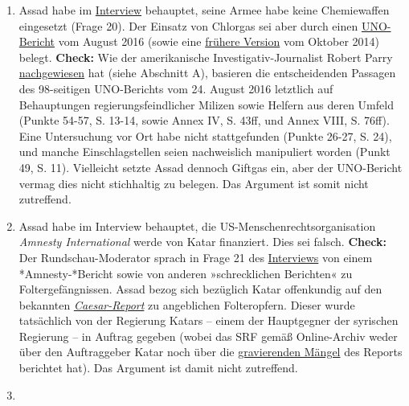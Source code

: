 \begin{enumerate}
\def\labelenumi{\arabic{enumi}.}
\tightlist
\item
  Assad habe im
  \href{https://www.srf.ch/content/download/11266054/127635839/version/2/file/Transkript+des+ganzen+Interviews.pdf}{Interview}
  behauptet, seine Armee habe keine Chemiewaffen eingesetzt (Frage 20).
  Der Einsatz von Chlorgas sei aber durch einen
  \href{http://daccess-ods.un.org/access.nsf/GetFile?OpenAgent\&DS=S/2016/738\&Lang=E\&Type=PDF}{UNO-Bericht}
  vom August 2016 (sowie eine
  \href{http://www.ohchr.org/Documents/HRBodies/HRCouncil/CoISyria/A.HRC.27.60_Eng.pdf}{frühere
  Version} vom Oktober 2014) belegt. \textbf{Check:} Wie der
  amerikanische Investigativ-Journalist Robert Parry
  \href{https://consortiumnews.com/2016/09/08/un-team-heard-claims-of-staged-chemical-attacks/}{nachgewiesen}
  hat (siehe Abschnitt A), basieren die entscheidenden Passagen des
  98-seitigen UNO-Berichts vom 24. August 2016 letztlich auf
  Behauptungen regierungsfeindlicher Milizen sowie Helfern aus deren
  Umfeld (Punkte 54-57, S. 13-14, sowie Annex IV, S. 43ff, und Annex
  VIII, S. 76ff). Eine Untersuchung vor Ort habe nicht stattgefunden
  (Punkte 26-27, S. 24), und manche Einschlagstellen seien nachweislich
  manipuliert worden (Punkt 49, S. 11). Vielleicht setzte Assad dennoch
  Giftgas ein, aber der UNO-Bericht vermag dies nicht stichhaltig zu
  belegen. Das Argument ist somit nicht zutreffend.
\item
  Assad habe im Interview behauptet, die US-Menschenrechtsorganisation
  \emph{Amnesty International} werde von Katar finanziert. Dies sei
  falsch. \textbf{Check:} Der Rundschau-Moderator sprach in Frage 21 des
  \href{https://www.srf.ch/content/download/11266054/127635839/version/2/file/Transkript+des+ganzen+Interviews.pdf}{Interviews}
  von einem *Amnesty-*Bericht sowie von anderen »schrecklichen
  Berichten« zu Foltergefängnissen. Assad bezog sich bezüglich Katar
  offenkundig auf den bekannten
  \emph{\href{https://en.wikipedia.org/wiki/2014_Syrian_detainee_report}{Caesar-Report}}
  zu angeblichen Folteropfern. Dieser wurde tatsächlich von der
  Regierung Katars -- einem der Hauptgegner der syrischen Regierung --
  in Auftrag gegeben (wobei das SRF gemäß Online-Archiv weder über den
  Auftraggeber Katar noch über die
  \href{http://www.counterpunch.org/2016/03/04/the-caesar-photo-fraud-that-undermined-syrian-negotiations/}{gravierenden
  Mängel} des Reports berichtet hat). Das Argument ist damit nicht
  zutreffend.
\item

\end{enumerate}
